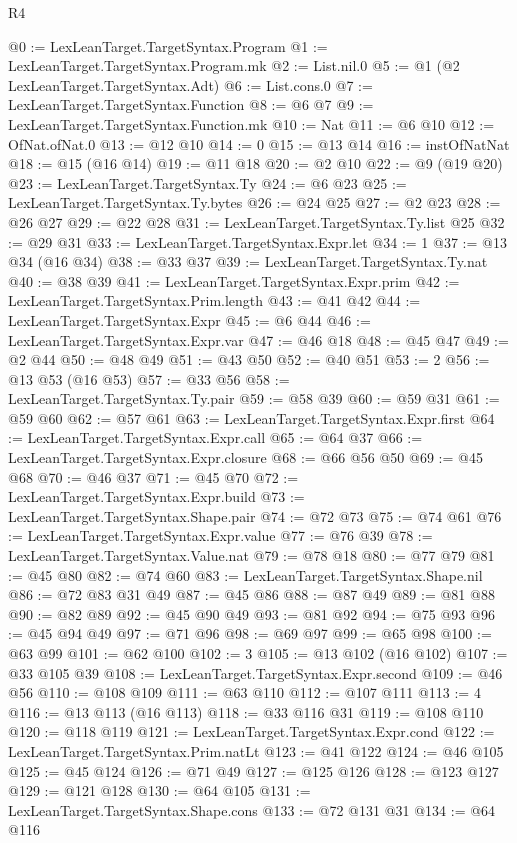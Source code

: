 \begin{lexlean}{R4}
\begin{coremodule}
@0 := LexLeanTarget.TargetSyntax.Program
@1 := LexLeanTarget.TargetSyntax.Program.mk
@2 := List.nil.{0}
@5 := @1 (@2 LexLeanTarget.TargetSyntax.Adt)
@6 := List.cons.{0}
@7 := LexLeanTarget.TargetSyntax.Function
@8 := @6 @7
@9 := LexLeanTarget.TargetSyntax.Function.mk
@10 := Nat
@11 := @6 @10
@12 := OfNat.ofNat.{0}
@13 := @12 @10
@14 := 0
@15 := @13 @14
@16 := instOfNatNat
@18 := @15 (@16 @14)
@19 := @11 @18
@20 := @2 @10
@22 := @9 (@19 @20)
@23 := LexLeanTarget.TargetSyntax.Ty
@24 := @6 @23
@25 := LexLeanTarget.TargetSyntax.Ty.bytes
@26 := @24 @25
@27 := @2 @23
@28 := @26 @27
@29 := @22 @28
@31 := LexLeanTarget.TargetSyntax.Ty.list @25
@32 := @29 @31
@33 := LexLeanTarget.TargetSyntax.Expr.let
@34 := 1
@37 := @13 @34 (@16 @34)
@38 := @33 @37
@39 := LexLeanTarget.TargetSyntax.Ty.nat
@40 := @38 @39
@41 := LexLeanTarget.TargetSyntax.Expr.prim
@42 := LexLeanTarget.TargetSyntax.Prim.length
@43 := @41 @42
@44 := LexLeanTarget.TargetSyntax.Expr
@45 := @6 @44
@46 := LexLeanTarget.TargetSyntax.Expr.var
@47 := @46 @18
@48 := @45 @47
@49 := @2 @44
@50 := @48 @49
@51 := @43 @50
@52 := @40 @51
@53 := 2
@56 := @13 @53 (@16 @53)
@57 := @33 @56
@58 := LexLeanTarget.TargetSyntax.Ty.pair
@59 := @58 @39
@60 := @59 @31
@61 := @59 @60
@62 := @57 @61
@63 := LexLeanTarget.TargetSyntax.Expr.first
@64 := LexLeanTarget.TargetSyntax.Expr.call
@65 := @64 @37
@66 := LexLeanTarget.TargetSyntax.Expr.closure
@68 := @66 @56 @50
@69 := @45 @68
@70 := @46 @37
@71 := @45 @70
@72 := LexLeanTarget.TargetSyntax.Expr.build
@73 := LexLeanTarget.TargetSyntax.Shape.pair
@74 := @72 @73
@75 := @74 @61
@76 := LexLeanTarget.TargetSyntax.Expr.value
@77 := @76 @39
@78 := LexLeanTarget.TargetSyntax.Value.nat
@79 := @78 @18
@80 := @77 @79
@81 := @45 @80
@82 := @74 @60
@83 := LexLeanTarget.TargetSyntax.Shape.nil
@86 := @72 @83 @31 @49
@87 := @45 @86
@88 := @87 @49
@89 := @81 @88
@90 := @82 @89
@92 := @45 @90 @49
@93 := @81 @92
@94 := @75 @93
@96 := @45 @94 @49
@97 := @71 @96
@98 := @69 @97
@99 := @65 @98
@100 := @63 @99
@101 := @62 @100
@102 := 3
@105 := @13 @102 (@16 @102)
@107 := @33 @105 @39
@108 := LexLeanTarget.TargetSyntax.Expr.second
@109 := @46 @56
@110 := @108 @109
@111 := @63 @110
@112 := @107 @111
@113 := 4
@116 := @13 @113 (@16 @113)
@118 := @33 @116 @31
@119 := @108 @110
@120 := @118 @119
@121 := LexLeanTarget.TargetSyntax.Expr.cond
@122 := LexLeanTarget.TargetSyntax.Prim.natLt
@123 := @41 @122
@124 := @46 @105
@125 := @45 @124
@126 := @71 @49
@127 := @125 @126
@128 := @123 @127
@129 := @121 @128
@130 := @64 @105
@131 := LexLeanTarget.TargetSyntax.Shape.cons
@133 := @72 @131 @31
@134 := @64 @116

\end{coremodule}
\end{lexlean}
